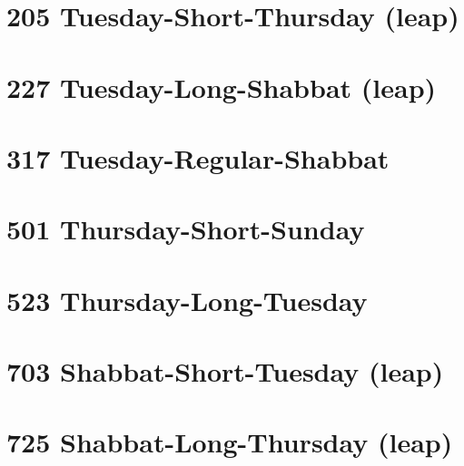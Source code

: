 
\toggletrue{leapyear}
\section{205 Tuesday-Short-Thursday (leap)}
\label{205}
\tishreiTues

\section{227 Tuesday-Long-Shabbat (leap)}
\label{227}
\tishreiTues

\section{317 Tuesday-Regular-Shabbat}
\label{317}
\tishreiTues

\section{501 Thursday-Short-Sunday}
\label{501}
\tishreiThurs

\section{523 Thursday-Long-Tuesday}
\label{523}
\tishreiThurs


\section{703 Shabbat-Short-Tuesday (leap)}
\label{703}
\tishreiShab


\kislevTues

\tevetWens

\section{725 Shabbat-Long-Thursday (leap)}
\label{725}
\tishreiShab

